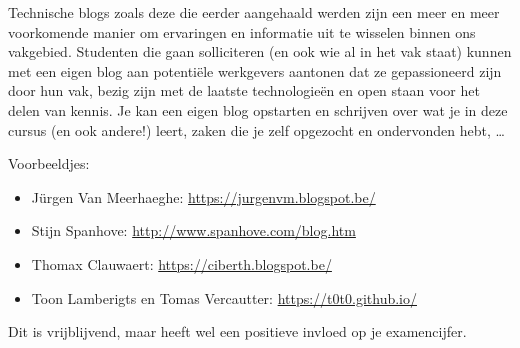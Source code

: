 Technische blogs zoals deze die eerder aangehaald werden zijn een meer
en meer voorkomende manier om ervaringen en informatie uit te wisselen
binnen ons vakgebied. Studenten die gaan solliciteren (en ook wie al in
het vak staat) kunnen met een eigen blog aan potentiële werkgevers
aantonen dat ze gepassioneerd zijn door hun vak, bezig zijn met de
laatste technologieën en open staan voor het delen van kennis. Je kan
een eigen blog opstarten en schrijven over wat je in deze cursus (en ook
andere!) leert, zaken die je zelf opgezocht en ondervonden hebt,
\ldots{}

Voorbeeldjes:

\begin{itemize}
\item
  Jürgen Van Meerhaeghe: \url{https://jurgenvm.blogspot.be/}
\item
  Stijn Spanhove: \url{http://www.spanhove.com/blog.htm}
\item
  Thomax Clauwaert: \url{https://ciberth.blogspot.be/}
\item
  Toon Lamberigts en Tomas Vercautter: \url{https://t0t0.github.io/}
\end{itemize}

Dit is vrijblijvend, maar heeft wel een positieve invloed op je
examencijfer.

